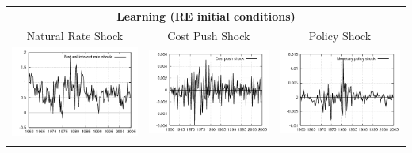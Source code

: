 \documentclass{beamer}
\begin{document}
{\begin{center}
\begin{tabular}{ccc}
  \multicolumn{3}{c}{\textbf{Learning  (RE initial conditions)}}  \\
  \small{Natural Rate Shock} & \small{Cost Push Shock} & \small{Policy Shock} \\
  \includegraphics[scale=0.23]{plots2/initre_natint.png} & \includegraphics[scale=0.23]{plots2/initre_costpush.png} & \includegraphics[scale=0.23]{plots2/initre_mpshock.png} \\ \\
  \end{tabular}
  \end{center}
}
\end{document}
